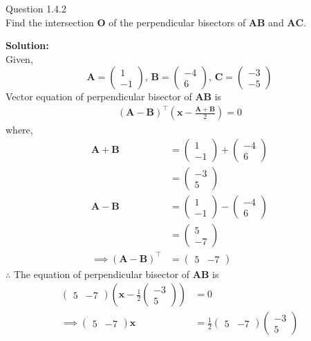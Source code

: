 \documentclass[journal,12pt,twocolumn]{IEEEtran}
\theoremstyle{remark}
\newcommand{\myvec}[1]{\ensuremath{\begin{pmatrix}#1\end{pmatrix}}}
\let\vec\mathbf
\newcommand{\solution}{\noindent \textbf{Solution: }}
\begin{document}
%

Question 1.4.2\\
Find the intersection $\vec{O}$ of the perpendicular bisectors of $\vec{AB}$ and $\vec{AC}$.

\solution \\
Given,
$$\vec{A}=\myvec{1\\-1} ,\, \vec{B}=\myvec{-4\\6} ,\, \vec{C}=\myvec{-3\\-5}$$
Vector equation of perpendicular bisector of $\vec{AB}$ is
\begin{align}
 (\vec{A}-\vec{B})^\top  \left( \vec{x} - \frac{\vec{A}+\vec{B}}{2}\right) = 0
\end{align}
where,
\begin{align}
\vec{A}+\vec{B}&=\myvec{1\\-1}+\myvec{-4\\6}\\
&=\myvec{-3\\5}\\
\vec{A}-\vec{B} &= \myvec{1\\-1}-\myvec{-4\\6}\\
&=\myvec{5\\-7}\\
\implies (\vec{A}-\vec{B})^\top &= \myvec{5&-7}
\end{align}
$\therefore $ The equation of perpendicular bisector of $\vec{AB}$ is
\begin{align}
\myvec{5&-7}\left( \vec{x}-\frac{1}{2}\myvec{-3\\5} \right)&=0\\
\implies \myvec{5&-7}\vec{x}&=\frac{1}{2}\myvec{5&-7}\myvec{-3\\5}
\end{align}
\end{document}
